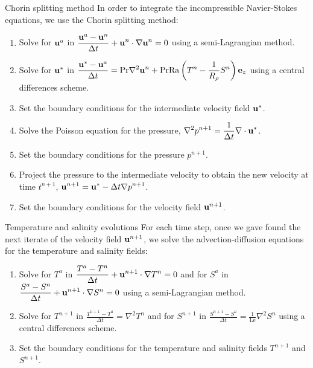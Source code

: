 \documentclass[10pt]{beamer}
\def\Ra{\mathrm{Ra}}
\def\Pr{\mathrm{Pr}}
\def\Le{\mathrm{Le}}
\begin{document}
\begin{frame}{Chorin splitting method}
  In order to integrate the incompressible Navier-Stokes equations, we use the Chorin splitting method:
  \begin{enumerate}
    \item Solve for $\boldsymbol{\mathrm{u}}^a$ in $\displaystyle  \frac{\boldsymbol{\mathrm{u}}^a-\boldsymbol{\mathrm{u}}^n}{\Delta t} + \boldsymbol{\mathrm{u}}^n \cdot \nabla \boldsymbol{\mathrm{u}}^n = 0$ using a semi-Lagrangian method.
    \item Solve for $\boldsymbol{\mathrm{u}}^*$ in $\displaystyle  \frac{\vf{u}^* - \vf{u}^a}{\Delta t} = \Pr \nabla^2 \vf{u}^n +\Pr\Ra\left(T^n - \frac{1}{R_{\rho}}S^n\right)\vf{e}_z$ using a central differences scheme.
    \item Set the boundary conditions for the intermediate velocity field $\boldsymbol{\mathrm{u}}^*$.
    \item Solve the Poisson equation for the pressure, $\displaystyle \nabla^2 p^{n+1} = \frac{1}{\Delta t}\nabla \cdot \boldsymbol{\mathrm{u}}^*$.
    \item Set the boundary conditions for the pressure $p^{n+1}$.
    \item Project the pressure to the intermediate velocity to obtain the new velocity at time $t^{n+1}$, $\displaystyle \boldsymbol{\mathrm{u}}^{n+1} = \boldsymbol{\mathrm{u}}^* - \Delta t\nabla p^{n+1}$.
    \item Set the boundary conditions for the velocity field $\boldsymbol{\mathrm{u}}^{n+1}$.
  \end{enumerate}
\end{frame}

\begin{frame}{Temperature and salinity evolutions}
  For each time step, once we gave found the next iterate of the velocity field $\boldsymbol{\mathrm{u}}^{n+1}$, we solve the advection-diffusion equations for the temperature and salinity fields:
  \begin{enumerate}
    \item Solve for $T^{a}$ in $\displaystyle  \frac{T^{a}-T^{n}}{\Delta t} + \boldsymbol{\mathrm{u}}^{n+1} \cdot \nabla T^{n} = 0$ and for $S^{a}$ in $\displaystyle  \frac{S^{a}-S^{n}}{\Delta t} + \boldsymbol{\mathrm{u}}^{n+1} \cdot \nabla S^{n} = 0$ using a semi-Lagrangian method.
    \item Solve for $T^{n+1}$ in $\displaystyle  \frac{T^{n+1}-T^{a}}{\Delta t} = \nabla^2 T^{n}$ and for $S^{n+1}$ in $\displaystyle  \frac{S^{n+1}-S^{a}}{\Delta t} = \frac{1}{\Le}\nabla^2 S^{n}$ using a central differences scheme.
    \item Set the boundary conditions for the temperature and salinity fields $T^{n+1}$ and $S^{n+1}$.
  \end{enumerate}
\end{frame}
\end{document}

